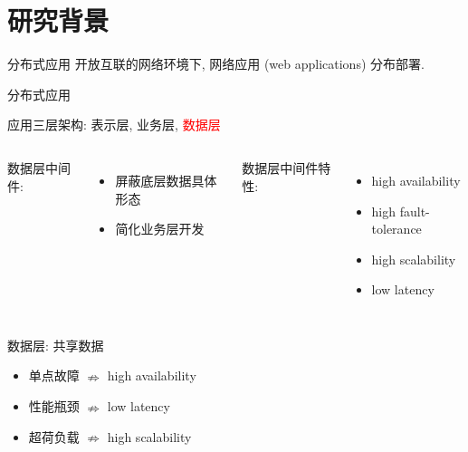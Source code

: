 \section{研究背景}

\begin{frame}{分布式应用}
  开放互联的网络环境下, 网络应用 (web applications) 分布部署.

\end{frame}
\begin{frame}{分布式应用}
  \begin{center}
    应用三层架构: 表示层, 业务层, \textcolor{red}{数据层}
  \end{center}


  \begin{columns}[t]
      数据层中间件:
      \begin{itemize}
	\item 屏蔽底层数据具体形态
	\item 简化业务层开发
      \end{itemize}
    数据层中间件特性:
      \begin{itemize}
	\item high availability
	\item high fault-tolerance
	\item high scalability
	\item low latency
      \end{itemize}
  \end{columns}

\end{frame}
\begin{frame}{数据层: 共享数据}

  \begin{itemize}
    \item 单点故障 $\nRightarrow$ high availability
    \item 性能瓶颈 $\nRightarrow$ low latency
    \item 超荷负载 $\nRightarrow$ high scalability
  \end{itemize}
\end{frame}
